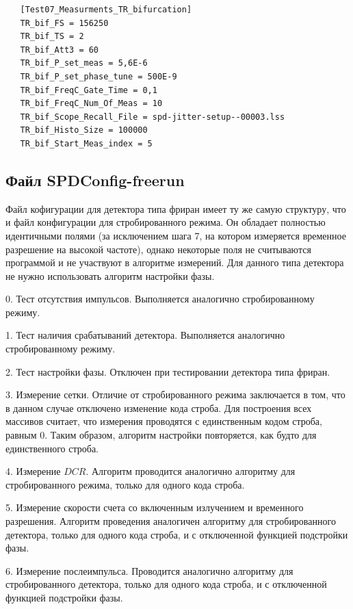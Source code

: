 \documentclass[12pt]{article}
\begin{document}
\begin{lstlisting}
   [Test07_Measurments_TR_bifurcation]
   TR_bif_FS = 156250
   TR_bif_TS = 2
   TR_bif_Att3 = 60
   TR_bif_P_set_meas = 5,6E-6
   TR_bif_P_set_phase_tune = 500E-9
   TR_bif_FreqC_Gate_Time = 0,1
   TR_bif_FreqC_Num_Of_Meas = 10
   TR_bif_Scope_Recall_File = spd-jitter-setup--00003.lss
   TR_bif_Histo_Size = 100000
   TR_bif_Start_Meas_index = 5
\end{lstlisting}

\subsection{Файл SPDConfig-freerun}

Файл кофигурации для детектора типа фриран имеет ту же самую структуру, что и файл конфигурации для стробированного режима. Он обладает полностью идентичными полями (за исключением шага 7, на котором измеряется временное разрешение на высокой частоте), однако некоторые поля не считываются программой и не участвуют в алгоритме измерений. Для данного типа детектора не нужно использовать алгоритм настройки фазы. 


0. Тест отсутствия импульсов. Выполняется аналогично стробированному режиму.

1. Тест наличия срабатываний детектора. Выполняется аналогично стробированному режиму.

2. Тест настройки фазы. Отключен при тестировании детектора типа фриран. 

3. Измерение сетки. Отличие от стробированного режима заключается в том, что в данном случае отключено изменение кода строба. Для построения всех массивов считает, что измерения проводятся с единственным кодом строба, равным 0. Таким образом,  алгоритм настройки повторяется, как будто для единственного строба. 

4. Измерение $DCR$. Алгоритм проводится аналогично алгоритму для стробированного режима, только для одного кода строба.

5. Измерение скорости счета со включенным излучением и временного разрешения. Алгоритм проведения аналогичен алгоритму для стробированного детектора, только для одного кода строба, и с отключенной функцией подстройки фазы. 

6. Измерение послеимпульса. Проводится аналогично алгоритму для стробированного детектора, только для одного кода строба, и с отключенной функцией подстройки фазы.
\end{document}
